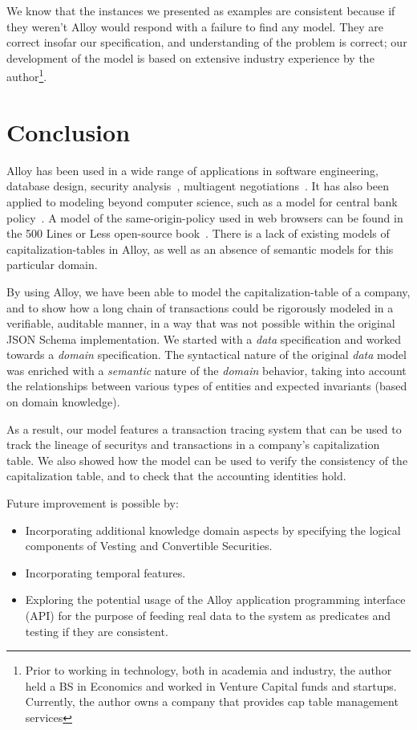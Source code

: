 We know that the instances we presented as examples are consistent because if they weren't Alloy would respond with a failure to find any model. They are correct insofar our specification, and understanding of the problem is correct; our development of the model is based on extensive industry experience by the author\footnote{Prior to working in technology, both in academia and industry, the author held a BS in Economics and worked in Venture Capital funds and startups. Currently, the author owns a company that provides cap table management services}.

\section{Conclusion}

Alloy has been used in a wide range of applications in software engineering, database design, \gls{security} analysis~\cite{Carpio2021}\cite{Chen2006}, multiagent negotiations~\cite{Podorozhny}. It has also been applied to modeling beyond computer science, such as a model for central bank policy~\cite{Johnson2021}. A model of the same-origin-policy used in web browsers can be found in the 500 Lines or Less open-source book~\cite{500Lines19:online}.
%
There is a lack of existing models of \glspl{capitalization-table} in Alloy, as well as an absence of semantic models for this particular domain.

By using Alloy, we have been able to model the \gls{capitalization-table} of a company, and to show how a long chain of \glspl{transaction} could be rigorously modeled in a verifiable, auditable manner, in a way that was not possible within the original JSON Schema implementation.
%
We started with a \textit{data} specification and worked towards a \textit{domain} specification. The syntactical nature of the original \textit{data} model was enriched with a \textit{semantic} nature of the \textit{domain} behavior, taking into account the relationships between various types of entities and expected invariants (based on domain knowledge).

As a result, our model features a transaction tracing system that can be used to track the lineage of \glspl{security} and \glspl{transaction} in a company's capitalization table. We also showed how the model can be used to verify the consistency of the capitalization table, and to check that the accounting identities hold.

Future improvement is possible by:

\begin{itemize}
    \item Incorporating additional knowledge domain aspects by specifying the logical components of Vesting and Convertible Securities.
    \item Incorporating temporal features.
    \item Exploring the potential usage of the Alloy application programming interface (API) for the purpose of feeding real data to the system as predicates and testing if they are consistent.
\end{itemize}


